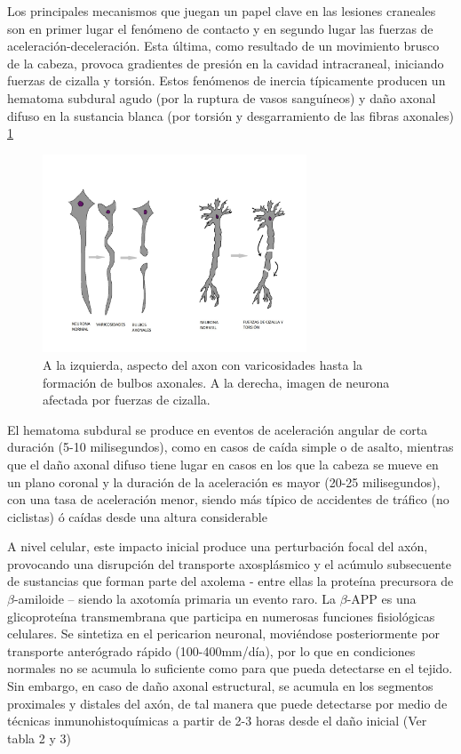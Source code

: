 Los principales mecanismos que juegan un papel clave en las lesiones craneales son en primer lugar el fenómeno de contacto y en segundo lugar las fuerzas de aceleración-deceleración\cite{Gaetz2004}. Esta última, como resultado de un movimiento brusco de la cabeza, provoca gradientes de presión en la cavidad intracraneal, iniciando fuerzas de cizalla y torsión. Estos fenómenos de inercia típicamente producen un hematoma subdural agudo (por la ruptura de vasos sanguíneos) y daño axonal difuso en la sustancia blanca (por torsión y desgarramiento de las fibras axonales) \ref{fig:figura4}

	\begin{figure}
	\centering
	\includegraphics[width=0.7\textwidth]{imagenes/Figura4}
	\caption{A la izquierda, aspecto del axon con varicosidades hasta la formación de bulbos axonales. A la derecha, imagen de neurona afectada por fuerzas de cizalla.}
	\label{fig:figura4}
\end{figure} 

El hematoma subdural se produce en eventos de aceleración angular de corta duración (5-10 milisegundos), como en casos de caída simple o de asalto, mientras que el daño axonal difuso tiene lugar en casos en los que la cabeza se mueve en un plano coronal y la duración de la aceleración es mayor (20-25 milisegundos), con una tasa de aceleración menor, siendo más típico de accidentes de tráfico (no ciclistas) ó caídas desde una altura considerable \cite{Oehmichen1998}

A nivel celular, este impacto inicial produce una perturbación focal del axón, provocando una disrupción del transporte axosplásmico y el acúmulo subsecuente de sustancias que forman parte del axolema - entre ellas la proteína precursora de $\beta$-amiloide – siendo la axotomía primaria un evento raro. La $\beta$-APP es una glicoproteína transmembrana que participa en numerosas funciones fisiológicas celulares. Se sintetiza en el pericarion neuronal, moviéndose posteriormente por transporte anterógrado rápido (100-400mm/día), por lo que en condiciones normales no se acumula lo suficiente como para que pueda detectarse en el tejido. Sin embargo, en caso de daño axonal estructural, se acumula en los segmentos proximales y distales del axón, de tal manera que puede detectarse por medio de técnicas inmunohistoquímicas a partir de 2-3 horas desde el daño inicial \cite{Gaetz2004} (Ver tabla 2 y 3) \cite{Hostiuc2014}

